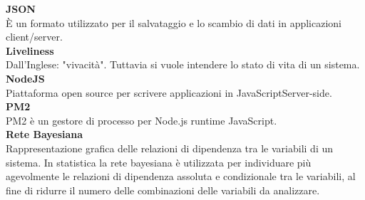 \textbf{JSON}\-\\
È un formato utilizzato per il salvataggio e lo scambio di dati in applicazioni client/server.\-\\

\textbf{Liveliness}\-\\
Dall'Inglese: "vivacità". Tuttavia si vuole intendere lo stato di vita di un sistema. \-\\


\textbf{NodeJS}\-\\
Piattaforma open source per scrivere applicazioni in JavaScript\glossario Server-side.\-\\

\textbf{PM2}\-\\
PM2 è un gestore di processo per Node.js runtime JavaScript. \-\\ 

\textbf{Rete Bayesiana} \-\\
Rappresentazione grafica delle relazioni di dipendenza tra le variabili di un sistema. In statistica la rete bayesiana è utilizzata per individuare più agevolmente le relazioni di dipendenza assoluta e condizionale tra le variabili, al fine di ridurre il numero delle combinazioni delle variabili da analizzare.\-\\


